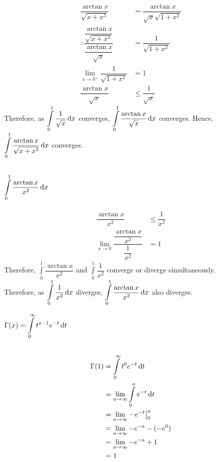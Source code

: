 \documentclass[fleqn, a4paper, draft]{amsart}
\makeatletter
\def\section{\@startsection{section}{1}%
	\z@{.7\linespacing\@plus\linespacing}{.5\linespacing}%
	{\normalfont\scshape}}%
\makeatother
\begin{document}
\begin{align*}
	\dfrac{\arctan x}{\sqrt{x + x^3}} &= \dfrac{\arctan x}{\sqrt{x}\sqrt{1 + x^2}}\\
	\therefore \dfrac{\dfrac{\arctan x}{\sqrt{x + x^3}}}{\dfrac{\arctan x}{\sqrt{x}}} &= \dfrac{1}{\sqrt{1 + x^2}}\\
	\lim\limits_{x \to 0^+} \dfrac{1}{\sqrt{1 + x^2}} &= 1\\
	\dfrac{\arctan x}{\sqrt{x}} &\leq \dfrac{1}{\sqrt{x}}
\end{align*}
Therefore, as $\displaystyle \int\limits_{0}^{1} \dfrac{1}{\sqrt{x}} \dif x$ converges, $\displaystyle \int\limits_{0}^{1} \dfrac{\arctan x}{\sqrt{x}} \dif x$ converges. 
Hence, $\displaystyle \int\limits_{0}^{1} \dfrac{\arctan x}{\sqrt{x + x^3}} \dif x$ converges.

\subsection{$\displaystyle \int\limits_{0}^{1} \dfrac{\arctan x}{x^2} \dif x$}

\begin{align*}
	\dfrac{\arctan x}{x^2} &\leq \dfrac{1}{x^2}\\
	\lim\limits_{x \to 0} \dfrac{\dfrac{\arctan x}{x^2}}{\dfrac{1}{x^2}} &= 1
\end{align*}
Therefore, $\displaystyle \int\limits_{0}^{1} \dfrac{\arctan x}{x^2}$ and $\displaystyle \int\limits_{0}^{1} \dfrac{1}{x^2}$ converge or diverge simultaneously.\\
Therefore, as $\displaystyle \int\limits_{0}^{1} \dfrac{1}{x^2} \dif x$ diverges, $\displaystyle \int\limits_{0}^{1} \dfrac{\arctan x}{x^2} \dif x$ also diverges.

\section{$\displaystyle \Gamma(x) = \int\limits_{0}^{\infty} t^{x - 1} e^{-t} \dif t$}

\subsection{}

\begin{align*}
	\Gamma(1) &= \int\limits_{0}^{\infty} t^0 e^{-t} \dif t\\
	&= \lim\limits_{a \to \infty} \int\limits_{0}^{a} e^{-t} \dif t\\
	&= \lim\limits_{a \to \infty} \left. -e^{-t} \right\rvert_{0}^{a}\\
	&= \lim\limits_{a \to \infty} -e^{-a} - (- e^0)\\
	&= \lim\limits_{a \to \infty} -e^{-a} + 1\\
	&= 1
\end{align*}
\end{document}
